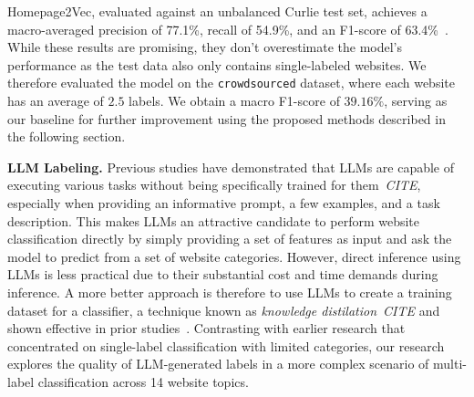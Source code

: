 Homepage2Vec, evaluated against an unbalanced Curlie test set, achieves a macro-averaged precision of 77.1\%, recall of 54.9\%, and an F1-score of 63.4\%~\cite{homepage2vec}. While these results are promising, they don't overestimate the model's performance as the test data also only contains single-labeled websites. We therefore evaluated the model on the \texttt{crowdsourced} dataset, where each website has an average of $2.5$ labels. We obtain a macro F1-score of $39.16\%$, serving as our baseline for further improvement using the proposed methods described in the following section.

\textbf{LLM Labeling.} Previous studies have demonstrated that LLMs are capable of executing various tasks without being specifically trained for them~\textit{CITE}, especially when providing an informative prompt, a few examples, and a task description. This makes LLMs an attractive candidate to perform website classification directly by simply providing a set of features as input and ask the model to predict from a set of website categories.
However, direct inference using LLMs is less practical due to their substantial cost and time demands during inference. A more better approach is therefore to use LLMs to create a training dataset for a classifier, a technique known as \textit{knowledge distilation}~\textit{CITE} and shown  effective in prior studies~\cite{reduce-labeling-cost, prompt-tuning, is-gpt3-good-annot, annollm}. Contrasting with earlier research that concentrated on single-label classification with limited categories, our research explores the quality of LLM-generated labels in a more complex scenario of multi-label classification across 14 website topics.
